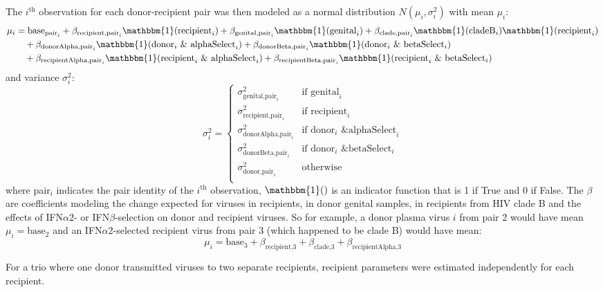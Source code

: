 \documentclass[12pt]{article}
\newcommand{\ifna}{IFN${\alpha 2}$}
\newcommand{\ifnb}{IFN${\beta}$}
\begin{document}
The $i^\text{th}$ observation for each donor-recipient pair was then modeled as a normal distribution $N(\mu_i,\sigma^2_i)$ with mean $\mu_i$:
\begin{align*}
  \mu_i&= \text{base}_{\text{pair}_i} + \beta_{\text{recipient,pair}_i} \mathbbm{1}(\text{recipient}_i) + \beta_{\text{genital,pair}_i} \mathbbm{1}(\text{genital}_i) + \beta_{\text{clade,pair}_i} \mathbbm{1}(\text{cladeB}_i)\mathbbm{1}(\text{recipient}_i)\\
  &\quad+ \beta_{\text{donorAlpha,pair}_i} \mathbbm{1}(\text{donor}_i \text{ \& alphaSelect}_i) + \beta_{\text{donorBeta,pair}_i} \mathbbm{1}(\text{donor}_i \text{ \& betaSelect}_i) \\
  &\quad+ \beta_{\text{recipientAlpha,pair}_i} \mathbbm{1}(\text{recipient}_i\text{ \& alphaSelect}_i) + \beta_{\text{recipientBeta,pair}_i} \mathbbm{1}(\text{recipient}_i \text{ \& betaSelect}_i) \\
\end{align*}
and variance $\sigma^2_i$:
\[
  \sigma^2_i = \begin{cases}
    \sigma^2_{\text{genital,pair}_i} & \text{if } \text{genital}_i\\
    \sigma^2_{\text{recipient,pair}_i} & \text{if } \text{recipient}_i\\
    \sigma^2_{\text{donorAlpha,pair}_i} & \text{if } \text{donor}_i \text{ \& alphaSelect}_i\\
    \sigma^2_{\text{donorBeta,pair}_i} & \text{if } \text{donor}_i \text{ \& betaSelect}_i\\
    \sigma^2_{\text{donor,pair}_i} & \text{otherwise}\\
  \end{cases}
\]
where pair$_i$ indicates the pair identity of the $i^\text{th}$ observation, $\mathbbm{1}()$ is an indicator function that is 1 if True and 0 if False. The $\beta$ are coefficients modeling the change expected for viruses in recipients, in donor genital samples, in recipients from HIV clade B and the effects of \ifna{}- or \ifnb{}-selection on donor and recipient viruses. So for example, a donor plasma virus $i$ from pair 2 would have mean $\mu_i = \text{base}_{2}$ and an \ifna{}-selected recipient virus from pair 3 (which happened to be clade B) would have mean:
\[\mu_i=\text{base}_{3} + \beta_{\text{recipient,3}} + \beta_{\text{clade,3}} + \beta_{\text{recipientAlpha,3}}\]

For a trio where one donor transmitted viruses to two separate recipients, recipient parameters were estimated independently for each recipient.
\end{document}
